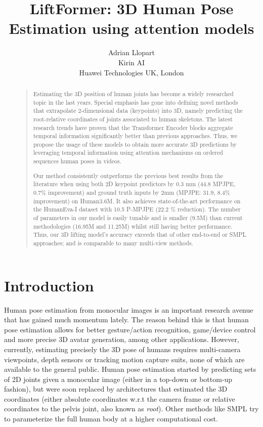 \documentclass[letterpaper]{article}
\begin{document}
\title{LiftFormer: 3D Human Pose Estimation using attention models}
\author{Adrian Llopart\\
Kirin AI\\
Huawei Technologies UK, London\\
}
\maketitle
\begin{abstract}
\begin{quote}
Estimating the 3D position of human joints has become a widely researched topic in the last years. Special emphasis has gone into defining novel methods that extrapolate 2-dimensional data (keypoints) into 3D, namely predicting the root-relative coordinates of joints associated to human skeletons.
The latest research trends have proven that the Transformer Encoder blocks aggregate temporal information significantly better than previous approaches. Thus, we propose the usage of these models to obtain more accurate 3D predictions by leveraging temporal information using attention mechanisms on ordered sequences human poses in videos.

Our method consistently outperforms the previous best results from the literature when using both 2D keypoint predictors by 0.3 mm (44.8 MPJPE, 0.7\% improvement) and ground truth inputs by 2mm (MPJPE: 31.9, 8.4\% improvement) on Human3.6M. It also achieves state-of-the-art performance on the HumanEva-I dataset with 10.5 P-MPJPE (22.2 \% reduction). The number of parameters in our model is easily tunable and is smaller (9.5M) than current methodologies (16.95M and 11.25M) whilst still having better performance.
Thus, our 3D lifting model's accuracy exceeds that of other end-to-end or SMPL approaches; and is comparable to many multi-view methods. 

\end{quote}
\end{abstract}

\section{Introduction}
Human pose estimation from monocular images is an important research avenue that has gained much momentum lately. The reason behind this is that human pose estimation allows for better gesture/action recognition, game/device control and more precise 3D avatar generation, among other applications. However, currently, estimating precisely the 3D pose of humans requires multi-camera viewpoints, depth sensors or tracking motion capture suits, none of which are available to the general public. Human pose estimation started by predicting sets of 2D joints given a monocular image (either in a top-down or bottom-up fashion), but were soon replaced by architectures that estimated the 3D coordinates (either absolute coordinates w.r.t the camera frame or relative coordinates to the pelvis joint, also known as \textit{root}). Other methods like SMPL try to parameterize the full human body at a higher computational cost.
\end{document}
